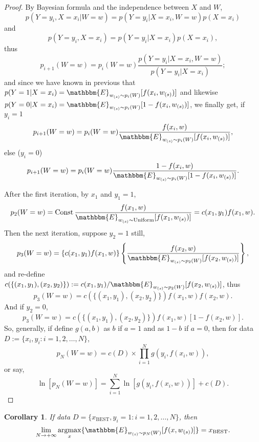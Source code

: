 \documentclass{article}
\newcommand{\assign}{:=}
\newcommand{\tmop}[1]{\ensuremath{\operatorname{#1}}}
\newtheorem{corollary}{Corollary}
\begin{document}
\begin{proof}
  By Bayesian formula and the independence between $X$ and $W$,
  \[ p ( Y=y_{i} ,X=x_{i} |W=w ) =p ( Y=y_{i} |X=x_{i} ,W=w )  p ( X=x_{i} )
  \]
  and
  \[ p ( Y=y_{i} ,X=x_{i} ) =p ( Y=y_{i} |X=x_{i} )  p ( X=x_{i} ) , \]
  thus
  \[ p_{i+1} ( W=w ) =p_{i} ( W=w )   \frac{p ( Y=y_{i} |X=x_{i} ,W=w )}{p (
     Y=y_{i} |X=x_{i} )} ; \]
  and since we have known in previous that $p ( Y=1|X=x_{i} )
  =\mathbbm{E}_{w_{( s )} \sim p_{i} ( W )} [  f ( x_{i} ,w_{( s )} ) ]$ and
  likewise $p ( Y=0|X=x_{i} ) =\mathbbm{E}_{w_{( s )} \sim p_{i} ( W )} [ 1- f
  ( x_{i} ,w_{( s )} ) ]$, we finally get, if $y_{i} =1$
  \[ p_{i+1} ( W=w ) =p_{i} ( W=w )   \frac{f ( x_{i} ,w )}{\mathbbm{E}_{w_{(
     s )} \sim p_{i} ( W )} [  f ( x_{i} ,w_{( s )} ) ]} , \]
  else ($y_{i} =0$)
  \[ p_{i+1} ( W=w ) =p_{i} ( W=w )   \frac{1-f ( x_{i} ,w
     )}{\mathbbm{E}_{w_{( s )} \sim p_{i} ( W )} [  1-f ( x_{i} ,w_{( s )} )
     ]} . \]
  
  
  After the first iteration, by $x_{1}$ and $y_{1} =1$,
  \[ p_{2} ( W=w ) = \tmop{Const}   \frac{f ( x_{1} ,w )}{\mathbbm{E}_{w_{( s
     )} \sim \tmop{Uniform}} [  f ( x_{1} ,w_{( s )} ) ]} =c ( x_{1} ,y_{1} ) 
     f ( x_{1} ,w ) . \]
  Then the next iteration, suppose $y_{2} =1$ still,
  \[ p_{3} ( W=w ) = \{ c ( x_{1} ,y_{1} )  f ( x_{1} ,w ) \}   \left\{
     \frac{f ( x_{2} ,w )}{\mathbbm{E}_{w_{( s )} \sim p_{2} ( W )} [  f (
     x_{2} ,w_{( s )} ) ]} \right\} , \]
  and re-define $c ( \{ ( x_{1} ,y_{1} ) , ( x_{2} ,y_{2} ) \} ) \assign c (
  x_{1} ,y_{1} ) /\mathbbm{E}_{w_{( s )} \sim p_{2} ( W )} [  f ( x_{2} ,w_{(
  s )} ) ]$, thus
  \[ p_{3} ( W=w ) =c ( \{ ( x_{1} ,y_{1} ) , ( x_{2} ,y_{2} ) \} )  f ( x_{1}
     ,w )  f ( x_{2} ,w ) . \]
  And if $y_{2} =0$,
  \[ p_{3} ( W=w ) =c ( \{ ( x_{1} ,y_{1} ) , ( x_{2} ,y_{2} ) \} )  f ( x_{1}
     ,w ) [  1-f ( x_{2} ,w ) ] . \]
  So, generally, if define $g ( a,b )$ as $b$ if $a=1$ and as $1-b$ if $a=0$,
  then for data $D \assign \{ x_{i} ,y_{i} :i=1,2, \ldots ,N \}$,
  \[ p_{N} ( W=w ) =c ( D ) \times \prod_{i=1}^{N} g ( y_{i} ,f ( x_{i} ,w ) )
     , \]
  or say,
  \[ \ln [ p_{N} ( W=w ) ] = \sum_{i=1}^{N}   \ln [ g ( y_{i} ,f ( x_{i} ,w )
     ) ] +c ( D ) . \]
\end{proof}



\begin{corollary}
  If data $D= \{ x_{\tmop{BEST}} ,y_{i} =1:i=1,2, \ldots ,N \}$, then
  \[ \lim_{N \rightarrow + \infty}   \underset{x}{\tmop{argmax}} \{
     \mathbbm{E}_{w_{( s )} \sim p_{N} ( W )} [ f ( x,w_{( s )} ) ] \}
     =x_{\tmop{BEST}} . \]
\end{corollary}
\end{document}
